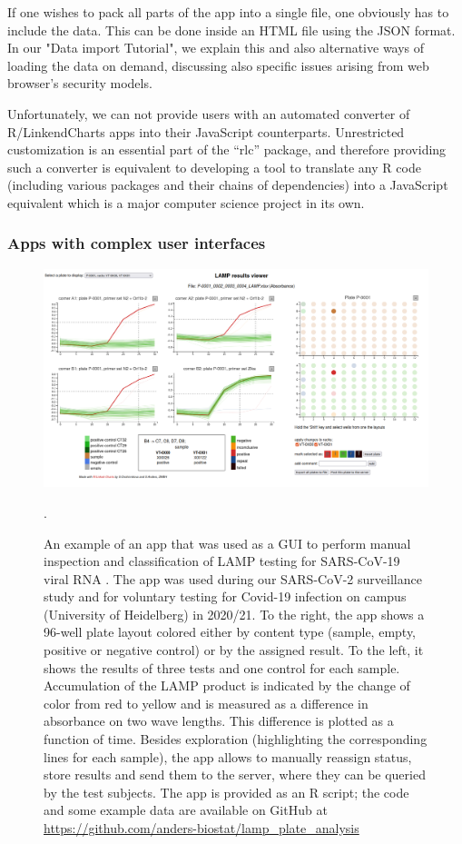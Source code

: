 \documentclass[twocolumn,10pt]{article}
\begin{document}
If one wishes to pack all parts of the app into a single file, one obviously has to include the data. This can be done inside an HTML file using the JSON format. In our "Data import Tutorial", we explain this and also alternative ways of loading the data on demand, discussing also specific issues arising from web browser's security models.

Unfortunately, we can not provide users with an automated converter of R/LinkendCharts apps into their JavaScript counterparts. Unrestricted customization is an essential part of the ``rlc'' package, and therefore providing such a converter is equivalent to developing a tool to translate any R code (including various packages and their chains of dependencies) into a JavaScript equivalent which is a major computer science project in its own.

\subsubsection{Apps with complex user interfaces}\label{gui_apps}

\begin{figure}[t]
   \includegraphics[width=\textwidth]{FigG/figG.png}
   \caption{An example of an app that was used as a GUI to perform manual inspection and classification of LAMP testing for SARS-CoV-19 viral RNA \citep{daothi_2020}. The app was used during our SARS-CoV-2 surveillance study \citep{deckert_2021} and for voluntary testing for Covid-19 infection on campus (University of Heidelberg) in 2020/21. To the right, the app shows a 96-well plate layout colored either by content type (sample, empty, positive or negative control) or by the assigned result. To the left, it shows the results of three tests and one control for each sample. Accumulation of the LAMP product is indicated by the change of color from red to yellow and is measured as a difference in absorbance on two wave lengths. This difference is plotted as a function of time. Besides exploration (highlighting the corresponding lines for each sample), the app allows to manually reassign status, store results and send them to the server, where they can be queried by the test subjects. The app is provided as an R script; the code and some example data are available on GitHub at \url{https://github.com/anders-biostat/lamp_plate_analysis}}.
   \label{lc_FigG}
\end{figure}
\end{document}
